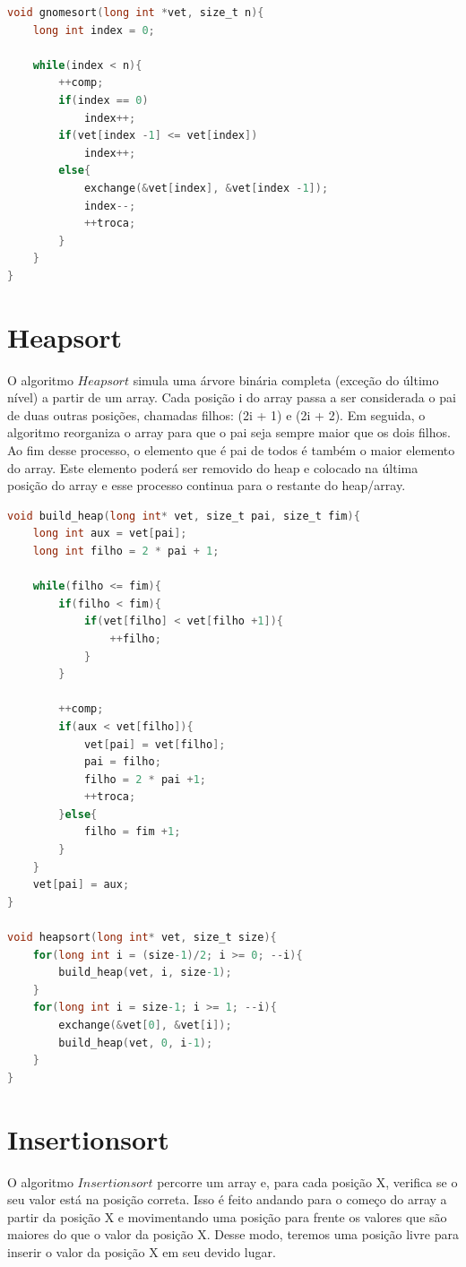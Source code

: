 \documentclass[report]{uftex}
\begin{document}
\begin{lstlisting}[language=C]
void gnomesort(long int *vet, size_t n){
    long int index = 0;
  
    while(index < n){
        ++comp;
        if(index == 0)
            index++;
        if(vet[index -1] <= vet[index])
            index++;
        else{
            exchange(&vet[index], &vet[index -1]);
            index--;
            ++troca;
        }
    }
}
\end{lstlisting}


\section{Heapsort}
O algoritmo $Heapsort$ simula uma árvore binária completa (exceção do último nível) a partir de um array. Cada posição i do array passa a ser considerada o pai de duas outras posições, chamadas filhos: (2i + 1) e (2i + 2). Em seguida, o algoritmo reorganiza o array para que o pai seja sempre maior que os dois filhos. Ao fim desse processo, o elemento que é pai de todos é também o maior elemento do array. Este elemento poderá ser removido do heap e colocado na última posição do array e esse processo continua para o restante do heap/array.\\

\begin{lstlisting}[language=C]
void build_heap(long int* vet, size_t pai, size_t fim){
    long int aux = vet[pai];
    long int filho = 2 * pai + 1;

    while(filho <= fim){
        if(filho < fim){
            if(vet[filho] < vet[filho +1]){
                ++filho;
            }
        }

        ++comp;
        if(aux < vet[filho]){
            vet[pai] = vet[filho];
            pai = filho;
            filho = 2 * pai +1;
            ++troca;
        }else{
            filho = fim +1;
        }
    }
    vet[pai] = aux;
}

void heapsort(long int* vet, size_t size){
    for(long int i = (size-1)/2; i >= 0; --i){
        build_heap(vet, i, size-1);
    }
    for(long int i = size-1; i >= 1; --i){
        exchange(&vet[0], &vet[i]);
        build_heap(vet, 0, i-1);
    }
}
\end{lstlisting}


\section{Insertionsort}
O algoritmo $Insertionsort$ percorre um array e, para cada posição X, verifica se o seu valor está na posição correta. Isso é feito andando para o começo do array a partir da posição X e movimentando uma posição para frente os valores que são maiores do que o valor da posição X. Desse modo, teremos uma posição livre para inserir o valor da posição X em seu devido lugar.\\
\end{document}
